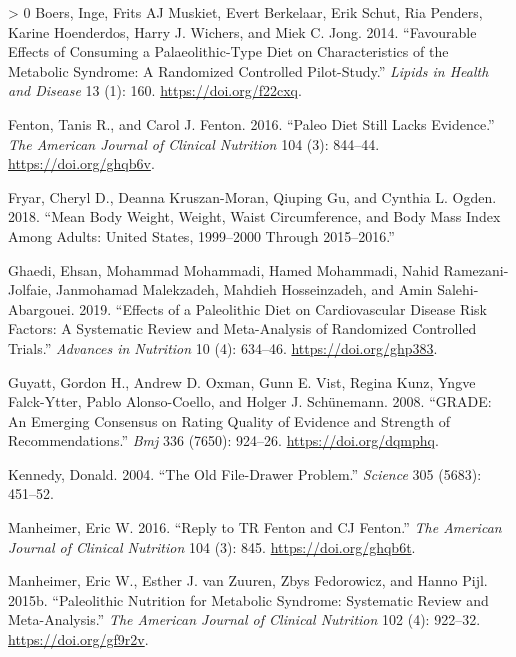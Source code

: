 \documentclass[]{tufte-handout}
\newlength{\cslhangindent}
\newenvironment{CSLReferences}[3] %
 {%
  \setlength{\parindent}{0pt}
  \ifodd #1 \everypar{\setlength{\hangindent}{\cslhangindent}}\ignorespaces\fi
  \ifnum #2 > 0
  \setlength{\parskip}{#2\baselineskip}
  \fi
 }%
 {}
\begin{document}
\hypertarget{refs}{}
\begin{CSLReferences}{1}{0}
\leavevmode\hypertarget{ref-boersFavourableEffectsConsuming2014}{}%
Boers, Inge, Frits AJ Muskiet, Evert Berkelaar, Erik Schut, Ria Penders,
Karine Hoenderdos, Harry J. Wichers, and Miek C. Jong. 2014.
{``Favourable Effects of Consuming a Palaeolithic-Type Diet on
Characteristics of the Metabolic Syndrome: A Randomized Controlled
Pilot-Study.''} \emph{Lipids in Health and Disease} 13 (1): 160.
\url{https://doi.org/f22cxq}.

\leavevmode\hypertarget{ref-fentonPaleoDietStill2016}{}%
Fenton, Tanis R., and Carol J. Fenton. 2016. {``Paleo Diet Still Lacks
Evidence.''} \emph{The American Journal of Clinical Nutrition} 104 (3):
844--44. \url{https://doi.org/ghqb6v}.

\leavevmode\hypertarget{ref-fryarMeanBodyWeight2018}{}%
Fryar, Cheryl D., Deanna Kruszan-Moran, Qiuping Gu, and Cynthia L.
Ogden. 2018. {``Mean Body Weight, Weight, Waist Circumference, and Body
Mass Index Among Adults: United States, 1999--2000 Through
2015--2016.''}

\leavevmode\hypertarget{ref-ghaediEffectsPaleolithicDiet2019}{}%
Ghaedi, Ehsan, Mohammad Mohammadi, Hamed Mohammadi, Nahid
Ramezani-Jolfaie, Janmohamad Malekzadeh, Mahdieh Hosseinzadeh, and Amin
Salehi-Abargouei. 2019. {``Effects of a Paleolithic Diet on
Cardiovascular Disease Risk Factors: A Systematic Review and
Meta-Analysis of Randomized Controlled Trials.''} \emph{Advances in
Nutrition} 10 (4): 634--46. \url{https://doi.org/ghp383}.

\leavevmode\hypertarget{ref-guyattGRADEEmergingConsensus2008}{}%
Guyatt, Gordon H., Andrew D. Oxman, Gunn E. Vist, Regina Kunz, Yngve
Falck-Ytter, Pablo Alonso-Coello, and Holger J. Schünemann. 2008.
{``GRADE: An Emerging Consensus on Rating Quality of Evidence and
Strength of Recommendations.''} \emph{Bmj} 336 (7650): 924--26.
\url{https://doi.org/dqmphq}.

\leavevmode\hypertarget{ref-kennedyOldFiledrawerProblem2004}{}%
Kennedy, Donald. 2004. {``The Old File-Drawer Problem.''} \emph{Science}
305 (5683): 451--52.

\leavevmode\hypertarget{ref-manheimerReplyTRFenton2016}{}%
Manheimer, Eric W. 2016. {``Reply to TR Fenton and CJ Fenton.''}
\emph{The American Journal of Clinical Nutrition} 104 (3): 845.
\url{https://doi.org/ghqb6t}.

\leavevmode\hypertarget{ref-manheimerPaleolithicNutritionMetabolic2015}{}%
Manheimer, Eric W., Esther J. van Zuuren, Zbys Fedorowicz, and Hanno
Pijl. 2015b. {``Paleolithic Nutrition for Metabolic Syndrome: Systematic
Review and Meta-Analysis.''} \emph{The American Journal of Clinical
Nutrition} 102 (4): 922--32. \url{https://doi.org/gf9r2v}.


\end{CSLReferences}
\end{document}
